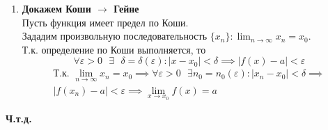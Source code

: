 \documentclass[12pt]{article}
\def\posl#1#2{\{#1_{#2}\}}
\begin{document}
\begin{adjustwidth}{1.5em}{1.5em}
\begin{enumerate}
            \item \textbf{Докажем Коши $\rightarrow$ Гейне}\\
            Пусть функция имеет предел по Коши.\\
            Зададим произвольную последовательность $\posl{x}{n} : \lim_{n\to\infty} x_n = x_0$.\\
            Т.к. определение по Коши выполняется, то
            \[
                \forall \varepsilon > 0 \text{ } \exists \text{ } \delta = \delta(\varepsilon) : |x - x_0| < \delta \implies |f(x) - a| < \varepsilon
            \]
            \begin{gather*}
                \text{Т.к. } \lim_{n\to\infty}x_n = x_0 \implies \forall \varepsilon > 0 \text{ } \exists n_0 = n_0(\varepsilon) : |x_n - x_0| < \delta \implies\\
                |f(x_n) - a| < \varepsilon \implies \lim_{x\to x_0} f(x) = a
            \end{gather*}
        \end{enumerate}
        \begin{center}
            \textbf{Ч.т.д.}
        \end{center}
    \end{adjustwidth}
\end{document}
